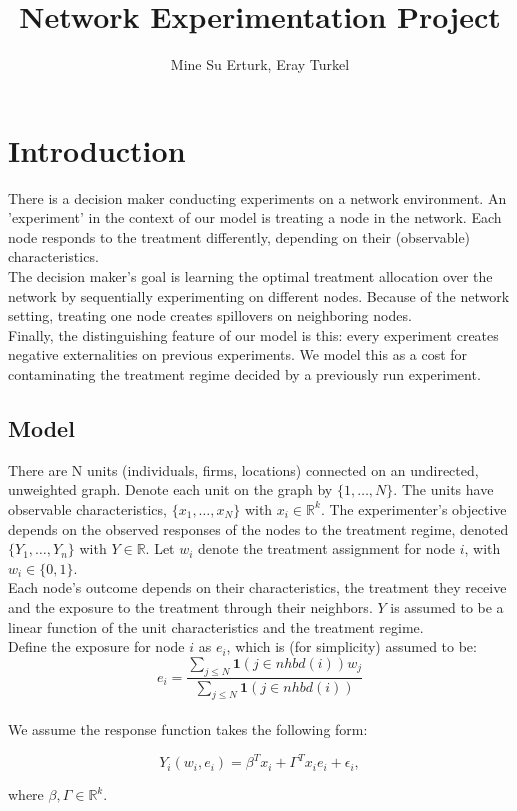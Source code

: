 \documentclass[12pt,a4paper]{article}
\author{Mine Su Erturk, Eray Turkel}
\title{Network Experimentation Project}
\begin{document}
\maketitle

\section{Introduction}

There is a decision maker conducting experiments on a network environment. An 'experiment' in the context of our model is treating a node in the network. Each node responds to the treatment differently, depending on their (observable) characteristics.\\

The decision maker's goal is learning the optimal treatment allocation over the network by sequentially experimenting on different nodes. Because of the network setting, treating one node creates spillovers on neighboring nodes.\\

Finally, the distinguishing feature of our model is this: every experiment creates negative externalities on previous experiments. We model this as a cost for contaminating the treatment regime decided by a previously run experiment.\\

\subsection{Model}

There are N units (individuals, firms, locations) connected on an undirected, unweighted graph. Denote each unit on the graph by $\{1, \dots, N \}$. The units have observable characteristics, $\{x_1 , \dots, x_N \}$ with $x_i \in \mathbb{R}^k$. The experimenter's objective depends on the observed responses of the nodes to the treatment regime, denoted $\{Y_1 , \dots, Y_n\}$ with $Y \in \mathbb{R}$. Let $w_i$ denote the treatment assignment for node $i$, with $w_i \in \{0,1\}$. \\

Each node's outcome depends on their characteristics, the treatment they receive and the exposure to the treatment through their neighbors. $Y$ is assumed to be a linear function of the unit characteristics and the treatment regime. \\

Define the exposure for node $i$ as $e_i$, which is (for simplicity) assumed to be: 
$$e_i = \frac { \sum_{j \leq N}  \mathbf{1}(j \in nhbd(i)) w_j}{ \sum_{j \leq N} \mathbf{1}(j \in nhbd(i)) }$$\\

We assume the response function takes the following form:

$$Y_i( w_i, e_i) = \beta^T x_i + \Gamma^T x_i e_i + \epsilon_i,$$

where $\beta, \Gamma \in \mathbb{R}^k$.
\end{document}
